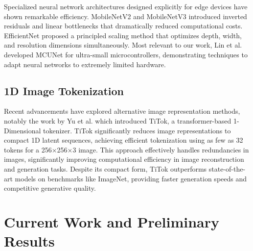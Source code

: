 \documentclass[11pt, oneside]{article}   	%
\begin{document}
Specialized neural network architectures designed explicitly for edge devices have shown remarkable efficiency. MobileNetV2 \cite{sandler2019mobilenetv2invertedresidualslinear} and MobileNetV3 \cite{howard2019searchingmobilenetv3} introduced inverted residuals and linear bottlenecks that dramatically reduced computational costs. EfficientNet \cite{tan2020efficientnetrethinkingmodelscaling} proposed a principled scaling method that optimizes depth, width, and resolution dimensions simultaneously. Most relevant to our work, Lin et al. \cite{lin2020mcunettinydeeplearning} developed MCUNet for ultra-small microcontrollers, demonstrating techniques to adapt neural networks to extremely limited hardware.

\subsection*{1D Image Tokenization}

Recent advancements have explored alternative image representation methods, notably the work by Yu et al. \cite{yu2024imageworth32tokens} which introduced TiTok, a transformer-based 1-Dimensional tokenizer. TiTok significantly reduces image representations to compact 1D latent sequences, achieving efficient tokenization using as few as 32 tokens for a 256×256×3 image. This approach effectively handles redundancies in images, significantly improving computational efficiency in image reconstruction and generation tasks. Despite its compact form, TiTok outperforms state-of-the-art models on benchmarks like ImageNet, providing faster generation speeds and competitive generative quality.



\section*{Current Work and Preliminary Results}
\end{document}
